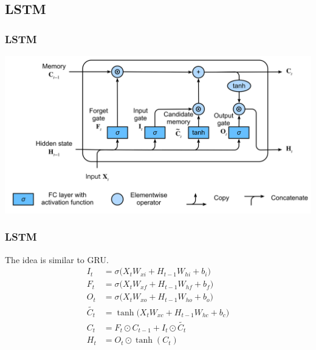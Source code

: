 \documentclass[]{beamer}
\begin{document}
\subsection{LSTM}
\begin{frame}
    \frametitle{LSTM}
    \includegraphics[scale = 0.1]{LSTM.png}
\end{frame}
\begin{frame}
    \frametitle{LSTM}
    The idea is similar to GRU\@.
    \begin{align*}
        I_t &= \sigma\bigl(X_t W_{xi} + H_{t-1} W_{hi} + b_i\bigr) \\
        F_t &= \sigma\bigl(X_t W_{xf} + H_{t-1} W_{hf} + b_f\bigr) \\
        O_t &= \sigma\bigl(X_t W_{xo} + H_{t-1} W_{ho} + b_o\bigr) \\
        \tilde{C_t} &= \tanh \bigl(X_t W_{xc} + H_{t-1}W_{hc} + b_c\bigr) \\
        C_t &= F_t \odot C_{t-1} + I_t \odot \tilde{C_t} \\
        H_t &= O_t \odot \tanh(C_t)
    \end{align*}
\end{frame}
\end{document}
